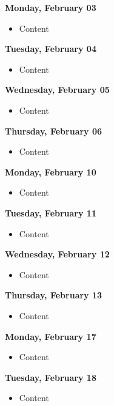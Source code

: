 \documentclass{article}
\begin{document}
\textbf{Monday, February 03}

\begin{itemize}
\item Content
\end{itemize}

\textbf{Tuesday, February 04}

\begin{itemize}
\item Content
\end{itemize}

\textbf{Wednesday, February 05}

\begin{itemize}
\item Content
\end{itemize}

\textbf{Thursday, February 06}

\begin{itemize}
\item Content
\end{itemize}

\textbf{Monday, February 10}

\begin{itemize}
\item Content
\end{itemize}

\textbf{Tuesday, February 11}

\begin{itemize}
\item Content
\end{itemize}

\textbf{Wednesday, February 12}

\begin{itemize}
\item Content
\end{itemize}

\textbf{Thursday, February 13}

\begin{itemize}
\item Content
\end{itemize}

\textbf{Monday, February 17}

\begin{itemize}
\item Content
\end{itemize}

\textbf{Tuesday, February 18}

\begin{itemize}
\item Content
\end{itemize}
\end{document}
